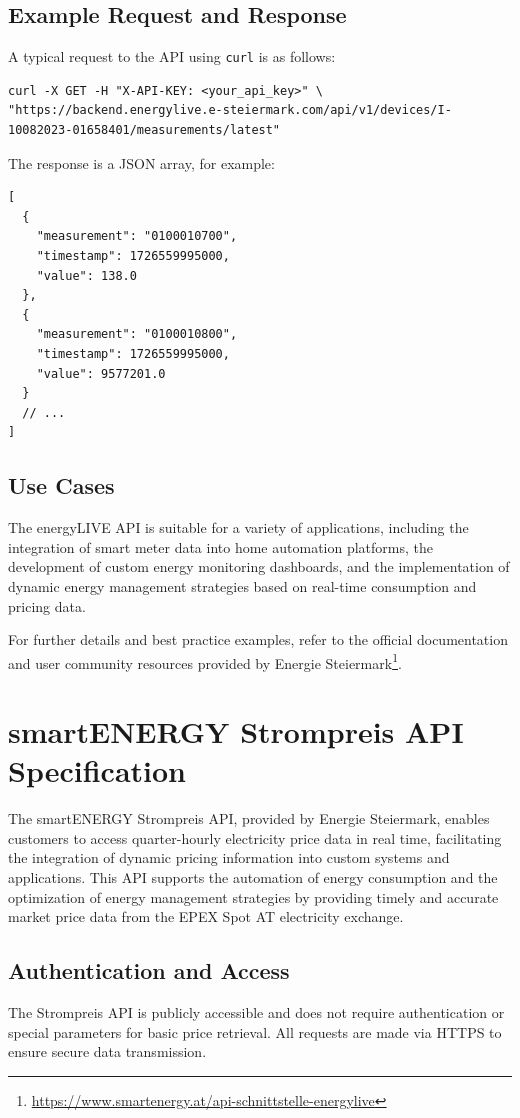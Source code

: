 \subsection{Example Request and Response}
A typical request to the API using \texttt{curl} is as follows:
\begin{lstlisting}
curl -X GET -H "X-API-KEY: <your_api_key>" \
"https://backend.energylive.e-steiermark.com/api/v1/devices/I-10082023-01658401/measurements/latest"
\end{lstlisting}

The response is a JSON array, for example:
\begin{lstlisting}
[
  {
    "measurement": "0100010700",
    "timestamp": 1726559995000,
    "value": 138.0
  },
  {
    "measurement": "0100010800",
    "timestamp": 1726559995000,
    "value": 9577201.0
  }
  // ...
]
\end{lstlisting}

\subsection{Use Cases}
The energyLIVE API is suitable for a variety of applications, including the integration of smart meter data into home automation platforms, the development of custom energy monitoring dashboards, and the implementation of dynamic energy management strategies based on real-time consumption and pricing data.

For further details and best practice examples, refer to the official documentation and user community resources provided by Energie Steiermark\footnote{\url{https://www.smartenergy.at/api-schnittstelle-energylive}}.

\newpage
\section{smartENERGY Strompreis API Specification}
\label{appendix:strompreis-api}

The smartENERGY Strompreis API, provided by Energie Steiermark, enables customers to access quarter-hourly electricity price data in real time, facilitating the integration of dynamic pricing information into custom systems and applications. This API supports the automation of energy consumption and the optimization of energy management strategies by providing timely and accurate market price data from the EPEX Spot AT electricity exchange.

\subsection{Authentication and Access}
The Strompreis API is publicly accessible and does not require authentication or special parameters for basic price retrieval. All requests are made via HTTPS to ensure secure data transmission.

